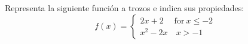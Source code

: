 \documentclass[addpoints,spanish, 12pt,a4paper]{exam}
\begin{document}
\begin{questions}
\question[1] Representa la siguiente función a trozos e indica sus propiedades:
$$f(x)=\begin{cases} 2 x + 2 & \text{for}\: x \leq -2 \\x^{2} - 2 x & \: x > -1 \end{cases}$$\begin{solution} \end{solution} 

\end{questions}
\end{document}
